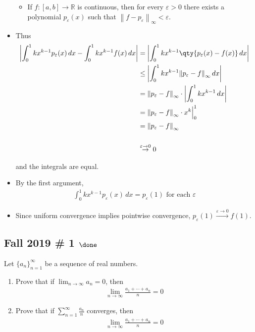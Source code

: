 \begin{solution}
\begin{itemize}
  \begin{itemize}
  \tightlist
  \item
    If \(f: [a, b] \to {\mathbb{R}}\) is continuous, then for every
    \(\varepsilon>0\) there exists a polynomial \(p_\varepsilon(x)\)
    such that
    \({\left\lVert {f - p_\varepsilon} \right\rVert}_\infty < \varepsilon\).
  \end{itemize}
\item
  Thus
  \begin{align*}
  {\left\lvert { \int_0^1 kx^{k-1} p_\varepsilon(x)\,dx - \int_0^1 kx^{k-1}f(x)\,dx  } \right\rvert} 
  &= {\left\lvert { \int_0^1 kx^{k-1} \qty{p_\varepsilon(x) - f(x)} \,dx  } \right\rvert} \\
  &\leq {\left\lvert { \int_0^1 kx^{k-1} {\left\lVert {p_\varepsilon-f} \right\rVert}_\infty \,dx  } \right\rvert} \\
  &= {\left\lVert {p_\varepsilon-f} \right\rVert}_\infty \cdot {\left\lvert { \int_0^1 kx^{k-1} \,dx  } \right\rvert} \\
  &= {\left\lVert {p_\varepsilon-f} \right\rVert}_\infty \cdot x^k \Big|_0^1 \\
  &= {\left\lVert {p_\varepsilon-f} \right\rVert}_\infty \\ \\
  &\overset{\varepsilon\to 0}\to 0
  \end{align*}

  and the integrals are equal.
\item
  By the first argument,
  \begin{align*}\int_0^1 kx^{k-1} p_\varepsilon(x) \,dx = p_\varepsilon(1) \text{ for each } \varepsilon\end{align*}
\item
  Since uniform convergence implies pointwise convergence,
  \(p_\varepsilon(1) \overset{\varepsilon\to 0}\to f(1)\).
\end{itemize}

\end{solution}

\hypertarget{fall-2019-1-done}{%
\subsection{\texorpdfstring{Fall 2019 \# 1
\(\done\)}{Fall 2019 \# 1 \textbackslash done}}\label{fall-2019-1-done}}

Let \(\{a_n\}_{n=1}^\infty\) be a sequence of real numbers.

\begin{enumerate}
\def\labelenumi{\alph{enumi}.}
\item
  Prove that if \(\displaystyle\lim_{n\to \infty } a_n = 0\), then
  \begin{align*}
  \lim _{n \rightarrow \infty} \frac{a_{1}+\cdots+a_{n}}{n}=0
  \end{align*}
\item
  Prove that if \(\displaystyle\sum_{n=1}^{\infty} \frac{a_{n}}{n}\)
  converges, then
  \begin{align*}
  \lim _{n \rightarrow \infty} \frac{a_{1}+\cdots+a_{n}}{n}=0
  \end{align*}
\end{enumerate}

